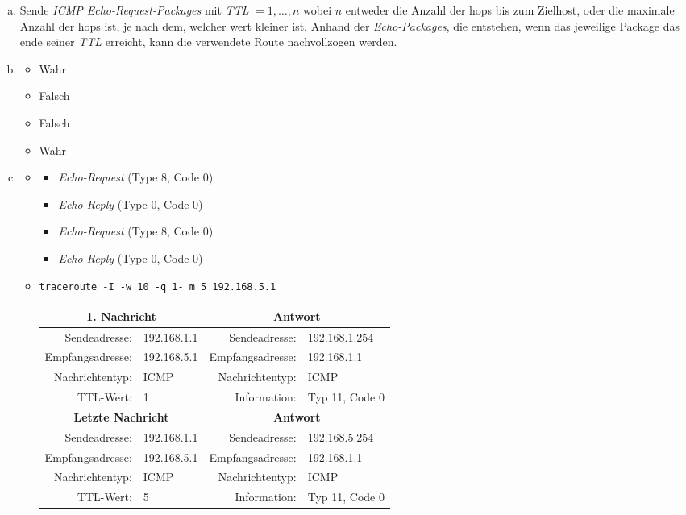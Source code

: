 \begin{enumerate}[a)]
	\item Sende \textit{ICMP Echo-Request-Packages} mit \textit{TTL} $= 1,\dots,n$ wobei $n$ entweder die Anzahl der hops bis zum Zielhost, oder die maximale Anzahl der hops ist, je nach dem, welcher wert kleiner ist. Anhand der \textit{Echo-Packages}, die entstehen, wenn das jeweilige Package das ende seiner \textit{TTL} erreicht, kann die verwendete Route nachvollzogen werden.

	\item \begin{itemize}
		\item Wahr
		\item Falsch
		\item Falsch
		\item Wahr
	\end{itemize}
	
	\item \begin{itemize}
		\item \begin{itemize}
			\item \textit{Echo-Request} (Type 8, Code 0)
			\item \textit{Echo-Reply} (Type 0, Code 0)
			\item \textit{Echo-Request} (Type 8, Code 0)
			\item \textit{Echo-Reply} (Type 0, Code 0)
		\end{itemize}
		\item \texttt{traceroute -I -w 10 -q 1- m 5 192.168.5.1}
		
		\begin{tabular}{|r|l|r|l|}
			\hline
			\multicolumn{2}{|c|}{\textbf{1. Nachricht}} & \multicolumn{2}{c|}{\textbf{Antwort}} \\ \hline
			Sendeadresse:    & 192.168.1.1 & Sendeadresse:    & 192.168.1.254 \\ \hline
			Empfangsadresse: & 192.168.5.1 & Empfangsadresse: & 192.168.1.1 \\ \hline
			Nachrichtentyp:  & ICMP        & Nachrichtentyp:  & ICMP \\ \hline
			TTL-Wert:        & 1           & Information:     & Typ 11, Code 0 \\ 
			\hline \hline
			\multicolumn{2}{|c|}{\textbf{Letzte Nachricht}} & \multicolumn{2}{c|}{\textbf{Antwort}} \\ \hline
			Sendeadresse:    & 192.168.1.1 & Sendeadresse:    & 192.168.5.254 \\ \hline
			Empfangsadresse: & 192.168.5.1 & Empfangsadresse: & 192.168.1.1 \\ \hline
			Nachrichtentyp:  & ICMP        & Nachrichtentyp:  & ICMP \\ \hline
			TTL-Wert:        & 5           & Information:     & Typ 11, Code 0 \\ \hline
			 
		\end{tabular}
	\end{itemize}
\end{enumerate}




